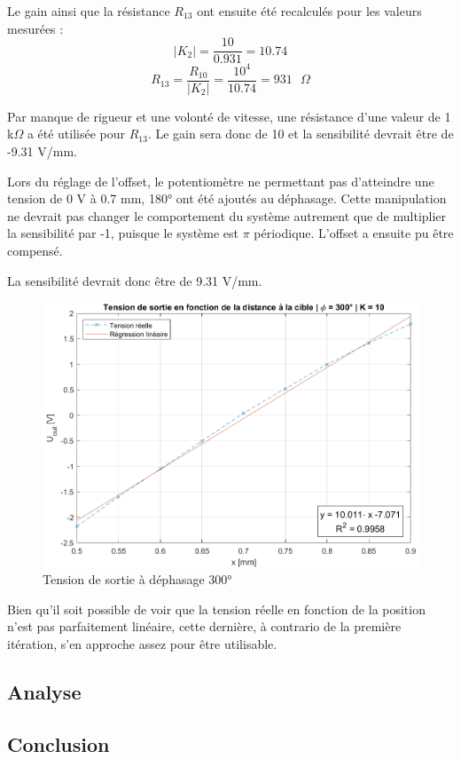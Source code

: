 Le gain ainsi que la résistance $R_{13}$ ont ensuite été recalculés pour les valeurs mesurées :
\begin{equation*}
    |K_2| = \frac{10}{0.931} = 10.74
\end{equation*}
\begin{equation*}
    R_{13} = \frac{R_{10}}{|K_2|}= \frac{10^4}{10.74}= 931\text{ }\Omega
\end{equation*}

Par manque de rigueur et une volonté de vitesse, une résistance d'une valeur de 1 k$\Omega$
a été utilisée pour $R_{13}$. Le gain sera donc de 10 et la sensibilité devrait être de -9.31 V/mm.
\vspace{0.2cm}

Lors du réglage de l'offset, le potentiomètre ne permettant pas d'atteindre une tension de 0 V à
0.7 mm, 180° ont été ajoutés au déphasage. Cette manipulation ne devrait pas changer le comportement
du système autrement que de multiplier la sensibilité par -1, puisque le système est $\pi$ périodique.
L'offset a ensuite pu être compensé.
\vspace{0.2cm}

La sensibilité devrait donc être de 9.31 V/mm.

\begin{figure}[H]
    \centering
    \includegraphics[width=15cm]{Images/Seance5/uout3.png}
    \caption{Tension de sortie à déphasage 300°}
    \label{fig:uout3}
\end{figure}

Bien qu'il soit possible de voir que la tension réelle en fonction de la position n'est pas 
parfaitement linéaire, cette dernière, à contrario de la première itération, s'en approche assez
pour être utilisable.
\subsection{Analyse}

\subsection{Conclusion}